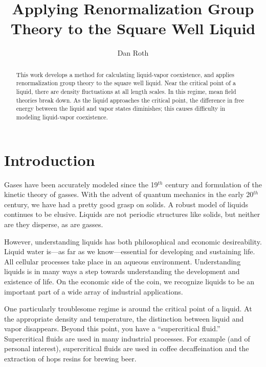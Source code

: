 \documentclass[letterpaper,twocolumn,amsmath,amssymb,prb]{revtex4-1}
\begin{document}
\title{Applying Renormalization Group Theory to the Square Well Liquid}

\author{Dan Roth}

\begin{abstract}

This work develops a method for calculating liquid-vapor coexistence,
and applies renormalization group theory to the square well
liquid. Near the critical point of a liquid, there are density
fluctuations at all length scales. In this regime, mean field theories
break down. As the liquid approaches the critical point, the
difference in free energy between the liquid and vapor states
diminishes; this causes difficulty in modeling liquid-vapor
coexistence.

\end{abstract}

\maketitle

\section{Introduction}
Gases have been accurately modeled since the 19$^{th}$
century\cite{Lederman92} and formulation of the kinetic theory of gasses. With the
advent of quantum mechanics in the early 20$^{th}$ century, we have
had a pretty good grasp on solids. A robust model of liquids continues
to be elusive. Liquids are not periodic structures like solids, but
neither are they disperse, as are gasses.

However, understanding liquids has both philosophical and economic
desireability. Liquid water is---as far as we know---essential for
developing and sustaining life. All cellular processes take place in an
aqueous environment. Understanding liquids is in many ways a step
towards understanding the development and existence of life. On the
economic side of the coin, we recognize liquids to be an important
part of a wide array of industrial applications.

One particularly troublesome regime is around the critical
point of a liquid. At the appropriate density and temperature, the
distinction between liquid and vapor disappears. Beyond this point,
you have a ``supercritical fluid.'' Supercritical fluids are used in
many industrial processes.\cite{Perrut00} For example (and of personal
interest), supercritical fluids are used in coffee decaffeination and
the extraction of hops resins for brewing beer.
\end{document}
